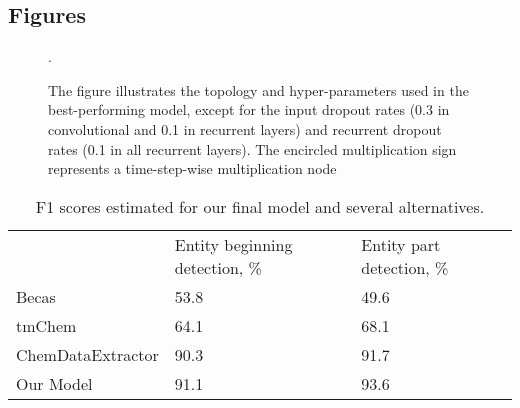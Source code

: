 \documentclass[twocolumn]{bmcart}%
\begin{document}
\begin{backmatter}




\section*{Figures}

\begin{figure}[h!]
  \caption{
      The figure illustrates the topology and hyper-parameters used in the best-performing model, except for the input dropout rates (0.3 in convolutional and 0.1 in recurrent layers) and recurrent dropout rates (0.1 in all recurrent layers).
   The encircled multiplication sign represents a time-step-wise multiplication node}.
   \label{fig:network}
\end{figure}


\begin{table}[h!]
\centering
\caption{F1 scores estimated for our final model and several alternatives.}
\label{tab:performance}
\begin{tabular}{lll}
                  & Entity beginning detection, \% & Entity part detection, \% \\
Becas             & 53.8                           & 49.6                      \\
tmChem            & 64.1                           & 68.1                      \\
ChemDataExtractor & 90.3                           & 91.7                      \\
Our Model         & 91.1                           & 93.6                     
\end{tabular}
\end{table}


\end{backmatter}
\end{document}

